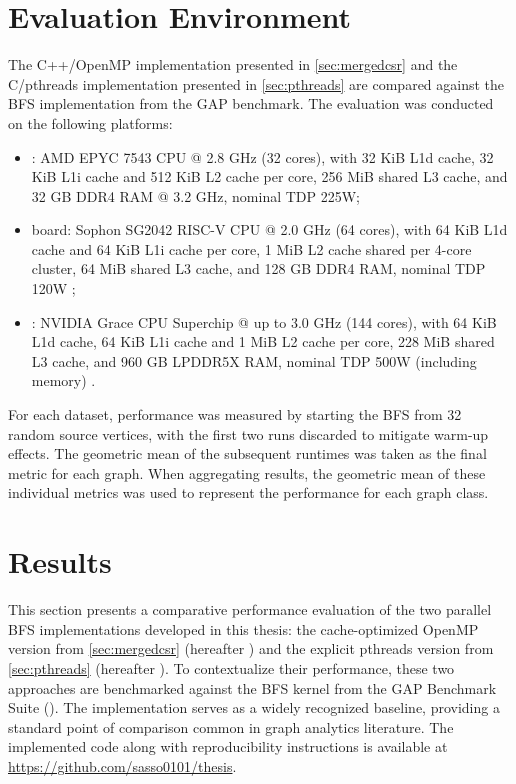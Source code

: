 \section{Evaluation Environment}
The C++/OpenMP implementation presented in \cref{sec:mergedcsr} and the C/pthreads implementation presented in \cref{sec:pthreads} are compared against the BFS implementation from the GAP benchmark. The evaluation was conducted on the following platforms:
\begin{itemize}
    \item \amd{}: AMD EPYC 7543 CPU @ 2.8 GHz (32 cores), with 32 KiB L1d cache, 32 KiB L1i cache and 512 KiB L2 cache per core, 256 MiB shared L3 cache, and 32 GB DDR4 RAM @ 3.2 GHz, nominal TDP 225W;
    \vspace{-2mm}
    \item \pioneer{} board: Sophon SG2042 RISC-V CPU @ 2.0 GHz (64 cores), with 64 KiB L1d cache and 64 KiB L1i cache per core, 1 MiB L2 cache shared per 4-core cluster, 64 MiB shared L3 cache, and 128 GB DDR4 RAM, nominal TDP 120W \cite{brown2023performance};
    \vspace{-2mm}
    \item \grace{}: NVIDIA Grace CPU Superchip @ up to 3.0 GHz (144 cores), with 64 KiB L1d cache, 64 KiB L1i cache and 1 MiB L2 cache per core, 228 MiB shared L3 cache, and 960 GB LPDDR5X RAM, nominal TDP 500W (including memory) \cite{elster2022nvidia}.
    \vspace{-2mm}
\end{itemize}
For each dataset, performance was measured by starting the BFS from 32 random source vertices, with the first two runs discarded to mitigate warm-up effects. The geometric mean of the subsequent runtimes was taken as the final metric for each graph. When aggregating results, the geometric mean of these individual metrics was used to represent the performance for each graph class.

\section{Results}
This section presents a comparative performance evaluation of the two parallel BFS implementations developed in this thesis: the cache-optimized OpenMP version from \cref{sec:mergedcsr} (hereafter \openmp{}) and the explicit pthreads version from \cref{sec:pthreads} (hereafter \pthreads{}). To contextualize their performance, these two approaches are benchmarked against the BFS kernel from the GAP Benchmark Suite (\gapbs{}). The \gapbs{} implementation serves as a widely recognized baseline, providing a standard point of comparison common in graph analytics literature. The implemented code along with reproducibility instructions is available at \url{https://github.com/sasso0101/thesis}.

